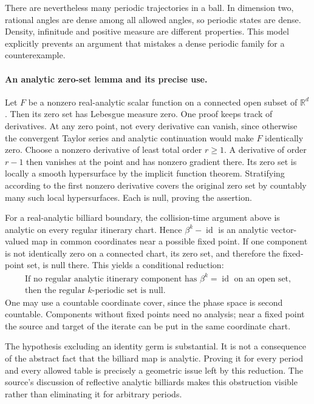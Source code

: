 \documentclass[11pt]{article}
\begin{document}
There are nevertheless many periodic trajectories in a ball. In
dimension two, rational angles are dense among all allowed angles,
so periodic states are dense. Density, infinitude and positive
measure are different properties. This model explicitly prevents
an argument that mistakes a dense periodic family for a counterexample.

\paragraph{An analytic zero-set lemma and its precise use.}
Let $F$ be a nonzero real-analytic scalar function on a connected
open subset of $\mathbb R^d$. Then its zero set has Lebesgue
measure zero. One proof keeps track of derivatives. At any zero
point, not every derivative can vanish, since otherwise the convergent
Taylor series and analytic continuation would make $F$ identically
zero. Choose a nonzero derivative of least total order $r\geq1$.
A derivative of order $r-1$ then vanishes at the point and has
nonzero gradient there. Its zero set is locally a smooth hypersurface
by the implicit function theorem. Stratifying according to the first
nonzero derivative covers the original zero set by countably many
such local hypersurfaces. Each is null, proving the assertion.

For a real-analytic billiard boundary, the collision-time argument
above is analytic on every regular itinerary chart. Hence
$\beta^k-\operatorname{id}$ is an analytic vector-valued map in
common coordinates near a possible fixed point. If one component
is not identically zero on a connected chart, its zero set, and
therefore the fixed-point set, is null there. This yields a conditional
reduction:
\[
 \begin{gathered}
 \text{If no regular analytic itinerary component has }
 \beta^k=\operatorname{id}\text{ on an open set,}\\
 \text{then the regular }k\text{-periodic set is null.}
 \end{gathered}
 \tag{379.5}
\]
One may use a countable coordinate cover, since the phase space is
second countable. Components without fixed points need no analysis;
near a fixed point the source and target of the iterate can be put
in the same coordinate chart.

The hypothesis excluding an identity germ is substantial. It is
not a consequence of the abstract fact that the billiard map is
analytic. Proving it for every period and every allowed table is
precisely a geometric issue left by this reduction. The source's
discussion of reflective analytic billiards makes this obstruction
visible rather than eliminating it for arbitrary periods.
\end{document}
